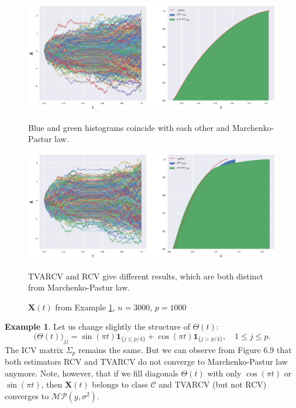 \documentclass[a4paper,11pt]{book}
\theoremstyle{plain}
\theoremstyle{definition}
\newtheorem{exmp}[thm]{Example}
\begin{document}
    \begin{figure}
    	\begin{center} \centering
    		\includegraphics[scale=0.4]{counter}
    		\caption{ $\mathbf{X}(t)$ from Example \ref{counter exmpl}, $n = 3000$, $p=1000$ }
    		\smallskip
    		\small
    		Blue and green histograms coincide with each other and Marchenko-Pastur law.
    	\end{center}
    	\begin{center} \centering
    		\includegraphics[scale=0.4]{counter2}
    		\caption{ $\mathbf{X}(t)$ from Example \ref{counter exmpl2}, $n = 3000$, $p=1000$ }
    		\smallskip
    		\small
    		TVARCV and RCV give different results, which are both distinct from Marchenko-Pastur law.
    	\end{center}
    \end{figure}
    
    \begin{exmp} \label{counter exmpl2}
    	Let us change slightly the structure of $\Theta(t)$:
    	\[ \Big(\Theta(t)\Big)_{jj} = \sin(\pi t) \mathbf{1}_{\{j \leq p/4\}} + \cos(\pi t) \mathbf{1}_{\{j > p/4\}}, \quad 1 \leq j \leq p.\]
    	The ICV matrix $\Sigma_p$ remains the same. But we can observe from Figure 6.9 that both estimators RCV and TVARCV do not converge to Marchenko-Pastur law anymore. Note, however, that if we fill diagonals $\Theta(t)$ with only $\cos(\pi t)$ or $\sin(\pi t)$, then $\mathbf{X}(t)$ belongs to class $\mathcal{C}$ and TVARCV (but not RCV) converges to $\mathcal{MP}(y, \sigma^2)$.
    \end{exmp}
    
\end{document}

